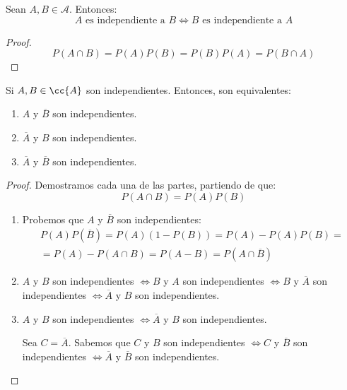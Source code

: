 \begin{coro} Sean $A,B\in \mathcal{A}$. Entonces:
\begin{equation*}
    \text{$A$ es independiente a $B$} \Longleftrightarrow
    \text{$B$ es independiente a $A$}
\end{equation*}
\end{coro}
\begin{proof}
    \begin{equation*}
        P(A\cap B) = P(A)P(B) = P(B)P(A) = P(B\cap A)
    \end{equation*}
\end{proof}

\begin{prop}
  Si $A,B\in \cc{A}$ son independientes. Entonces, son equivalentes:
  \begin{enumerate}
    \item $A$ y $\overline{B}$ son independientes.
    \item $\overline{A}$ y $B$ son independientes.
    \item $\overline{A}$ y $\overline{B}$ son independientes.
  \end{enumerate}
\end{prop}
\begin{proof}
    Demostramos cada una de las partes, partiendo de que: $$P(A\cap B)=P(A)P(B)$$
    \begin{enumerate}
        \item Probemos que $A$ y $\overline{B}$ son independientes:
        \begin{multline*}
            P(A)P(\overline{B}) = P(A)(1-P(B)) = P(A)-P(A)P(B) =\\= P(A) - P(A \cap B) = P(A - B) = P(A \cap \overline{B})
        \end{multline*}

        \item $A$ y $B$ son independientes $\Leftrightarrow B$ y $A$ son independientes $\Leftrightarrow B$ y $\overline{A}$ son independientes $\Leftrightarrow \overline{A}$ y $B$ son independientes.

        \item $A$ y $B$ son independientes $\Leftrightarrow \overline{A}$ y $B$ son independientes.
        
        Sea $C = \overline{A}$. Sabemos que $C$ y $B$ son independientes $\Leftrightarrow C$ y $\overline{B}$ son independientes $\Leftrightarrow
    \overline{A}$ y $\overline{B}$ son independientes.
    \end{enumerate}
\end{proof}

